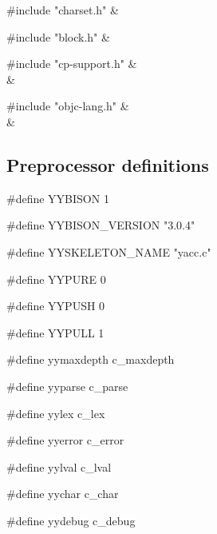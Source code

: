 \medskip
\begin{cxreftabi}
{\stt \#include "charset.h"} &\\
\end{cxreftabi}

\medskip
\begin{cxreftabi}
{\stt \#include "block.h"} &\\
\end{cxreftabi}

\medskip
\begin{cxreftabi}
{\stt \#include "cp-support.h"} &\\
\hspace*{0.2in}{\stt \#include "symtab.h"} &\\
\end{cxreftabi}

\medskip
\begin{cxreftabi}
{\stt \#include "objc-lang.h"} &\\
\hspace*{0.2in}{\stt \#include <Availability.h>} &\\
\end{cxreftabi}


\subsection*{Preprocessor definitions}

{\stt \#define YYBISON 1}

\medskip
{\stt \#define YYBISON\_VERSION "3.0.4"}

\medskip
{\stt \#define YYSKELETON\_NAME "yacc.c"}

\medskip
{\stt \#define YYPURE 0}

\medskip
{\stt \#define YYPUSH 0}

\medskip
{\stt \#define YYPULL 1}

\medskip
{\stt \#define yymaxdepth c\_maxdepth}

\medskip
{\stt \#define yyparse c\_parse}

\medskip
{\stt \#define yylex c\_lex}

\medskip
{\stt \#define yyerror c\_error}

\medskip
{\stt \#define yylval c\_lval}

\medskip
{\stt \#define yychar c\_char}

\medskip
{\stt \#define yydebug c\_debug}

